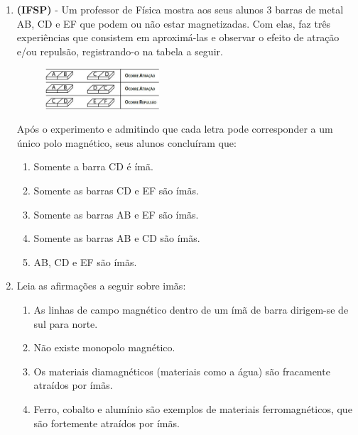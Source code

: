 \documentclass[12pt,letterpaper,fleqn]{article}
\begin{document}
\begin{itemize}
\begin{enumerate}
            \item \textbf{(IFSP)} - Um professor de Física mostra aos seus alunos 3 barras de metal AB, CD e EF que podem ou não estar magnetizadas. Com elas, faz três experiências que consistem em aproximá-las e observar o efeito de atração e/ou repulsão, registrando-o na tabela a seguir.
            \begin{figure}[h]
                \centering
                \includegraphics[width=0.4\textwidth]{ex_3_ifsp.jpg}
            \end{figure}
            
            Após o experimento e admitindo que cada letra pode corresponder a um único polo magnético, seus alunos concluíram que:
            
            \begin{enumerate}
                \item Somente a barra CD é ímã. 
                \item Somente as barras CD e EF são ímãs.
                \item Somente as barras AB e EF são ímãs.
                \item Somente as barras AB e CD são ímãs.
                \item AB, CD e EF são ímãs.
            \end{enumerate}
            
            \item Leia as afirmações a seguir sobre imãs:
            
            \begin{enumerate}
                \begin{enumerate}
                    \item As linhas de campo magnético dentro de um ímã de barra dirigem-se de sul para norte.
                    \item Não existe monopolo magnético.
                    \item Os materiais diamagnéticos (materiais como a água) são fracamente atraídos por ímãs.
                    \item Ferro, cobalto e alumínio são exemplos de materiais ferromagnéticos, que são fortemente atraídos por ímãs.
                \end{enumerate}
            \end{enumerate}
            

\end{enumerate}
\end{itemize}
\end{document}
